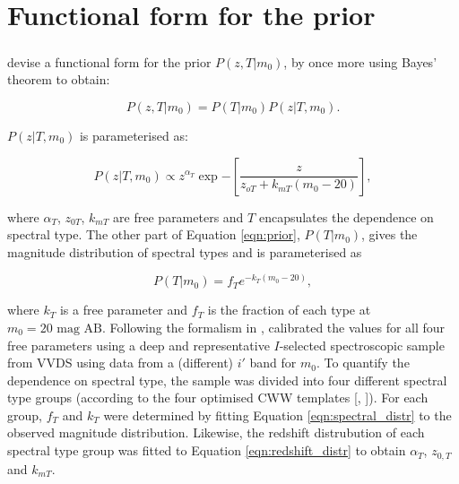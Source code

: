 \chapter{Functional form for the prior}\label{appendix:prior_function}
\paragraph{} \cite{2006A&A...457..841I} devise a functional form for the prior $P(z, T | m_{0})$, by once more using Bayes' theorem to obtain: 

\begin{equation}
P(z, T | m_{0}) = P(T | m_{0}) P(z | T, m_{0}). \label{eqn:prior}
\end{equation}

$P(z|T, m_{0})$ is parameterised as:
 
\begin{equation}
P(z|T,m_{0})  \propto z^{\alpha_{T}}\exp{-\left[ \frac{z}{z_{oT}+k_{mT}(m_{0} -20)} \right]},\label{eqn:redshift_distr}
\end{equation}

\noindent where $\alpha_{T}$, $z_{0T}$, $k_{mT}$ are free parameters and $T$ encapsulates the dependence on spectral type. The other part of Equation \ref{eqn:prior}, $P(T|m_{0})$, gives the magnitude distribution of spectral types and is parameterised as

\begin{equation}
P(T|m_{0}) = f_{T} e^{-k_{T}(m_{0}-20)},\label{eqn:spectral_distr}
\end{equation}

where $k_{T}$ is a free parameter  and $f_{T}$ is the fraction of each type at $m_{0} = 20 \textrm{ mag AB}$. Following the formalism in \cite{2000ApJ...536..571B}, \cite{2006A&A...457..841I} calibrated the values for all four free parameters using a deep and representative $I$-selected spectroscopic sample from VVDS \citep{2005A&A...439..845L} using data from a (different) $i'$ band for $m_{0}$. To quantify the dependence on spectral type, the sample was divided into four different spectral type groups (according to the four optimised CWW  templates [\cite{1980ApJS...43..393C}, \cite{2006A&A...457..841I}]). For each group,  $f_T$ and $k_T$ were determined by fitting Equation \ref{eqn:spectral_distr} to the observed magnitude distribution. Likewise, the redshift distrubution of each spectral type group was fitted to {\color{red} Equation \ref{eqn:redshift_distr}} to obtain $\alpha_{T}$, $z_{0,T}$ and $k_{mT}$. 
